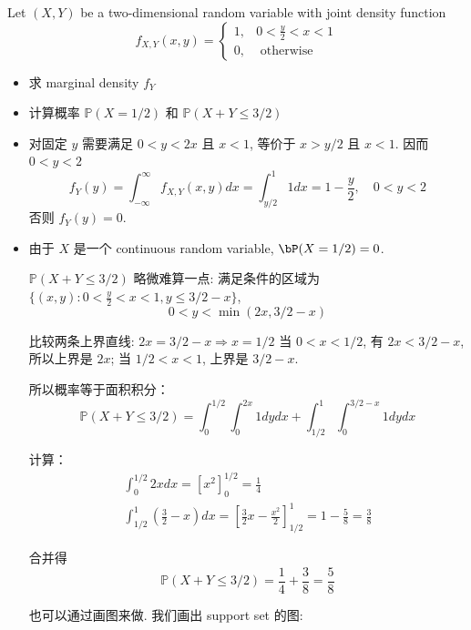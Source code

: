 \begin{example}
    Let $(X, Y)$ be a two-dimensional random variable with joint density function
     $$ f_{X, Y}(x, y)= \begin{cases}1, & 0<\frac{y}{2}<x<1 \\ 0, & \text { otherwise }\end{cases} $$ 
\begin{itemize}
    \item [(a)] 求 marginal density $f_Y$
    \item [(b)] 计算概率 $\mathbb{P}(X=1 / 2)$ 和 $\mathbb{P}(X+Y \leq 3 / 2)$
\end{itemize}
\begin{solution}
\begin{itemize}
\item [(a)] 
对固定 $y$ 需要满足 $0<y<2 x$ 且 $x<1$, 等价于 $x>y / 2$ 且 $x<1$. 因而 $0<y<2$ 
$$
f_Y(y)=\int_{-\infty}^{\infty} f_{X, Y}(x, y) d x=\int_{y / 2}^1 1 d x=1-\frac{y}{2}, \quad 0<y<2
$$
否则 $f_Y(y)=0$.
    
\item [(b)] 
由于 \(X\) 是一个 continuous random variable, \(\bP(X=1/2) = 0\).

 $\mathbb{P}(X+Y \leq 3 / 2)$ 略微难算一点: 
满足条件的区域为 \(\{(x,y): 0<\frac{y}{2}<x<1, y \leq 3/2 - x\}\),
$$
0<y<\min (2 x, 3 / 2-x)
$$

比较两条上界直线: $2 x=3 / 2-x \Rightarrow x=1 / 2$ 
当 $0<x<1 / 2$, 有 $2 x<3 / 2-x$, 所以上界是 $2 x$; 当 $1 / 2<x<1$, 上界是 $3 / 2-x$.

所以概率等于面积积分：
$$
\mathbb{P}(X+Y \leq 3 / 2)=\int_0^{1 / 2} \int_0^{2 x} 1 d y d x+\int_{1 / 2}^1 \int_0^{3 / 2-x} 1 d y d x
$$

计算：
$$
\begin{gathered}
\int_0^{1 / 2} 2 x d x=\left[x^2\right]_0^{1 / 2}=\frac{1}{4} \\
\int_{1 / 2}^1\left(\frac{3}{2}-x\right) d x=\left[\frac{3}{2} x-\frac{x^2}{2}\right]_{1 / 2}^1=1-\frac{5}{8}=\frac{3}{8}
\end{gathered}
$$

合并得
$$
\mathbb{P}(X+Y \leq 3 / 2)=\frac{1}{4}+\frac{3}{8}=\frac{5}{8}
$$

也可以通过画图来做. 我们画出 support set 的图: 
\begin{center}
\end{center}
\end{itemize}
\end{solution}
\end{example}
